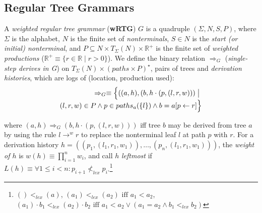 \documentclass[english]{article}
\newcommand\geneq{{\approx}}
\newcommand\comment[1]{}
\newcommand\powset[1]{\mathcal{P}(#1)}
\newcommand\logand{\wedge}
\newcommand\logor{\vee}
\newcommand\concat{\cdot}
\newcommand\assign{\leftarrow}
\newcommand\reals{\mathbb{R}}
\newcommand\positivereals{\mathbb{R}^{+}}
\newcommand\transformsto{\rightarrow}
\newcommand\derives{\Rightarrow}
\newcommand\logimplies{\implies} %
\newcommand\st{\;|\;}
\newcommand\bigst{\;\bigl | \;}
\newcommand{\kstar}{^{\star}}
\newcommand\cls[1]{\textbf{#1}}
\newcommand\derivess[1]{\derives_{#1}}
\begin{document}
\comment{
The \emph{$l$-labeled-children of $t$} are contained in the subsequence
$children_{t}^\geneq(l)=t\downarrow^\geneq (l)$:
\[
children_t^\geneq(l)\equiv  {
  c[subseqmap_{c,=_r}(l)] \text{ where } c\equiv children_t \text{ and } a=_rb \text{ iff } root(a)\geneq b
}
\]
}

\subsection{Regular Tree Grammars}

A \emph{weighted regular tree grammar} (\cls{wRTG}) $G$ is a quadruple
  $(\Sigma,N,S ,P)$, where $\Sigma$ is the alphabet, $N$ is the finite set of
  \emph{nonterminals}, $S \in{N}$ is the \emph{start (or initial) nonterminal},
  and \emph{$P\subseteq N\times T_{\Sigma}(N)\times\positivereals $} is the
  finite set of \emph{weighted productions} ($\positivereals \equiv\{
  r\in{\reals }\st r>0\}$).
  We define the binary relation $\derivess{G}$ (\emph{single-step derives in G})
  on $T_{\Sigma}(N) \times (paths \times P)\kstar$, pairs of trees and \emph{derivation histories}, which are logs of (location, production used):
  \[
  \begin{array}{r}
    \derives_{G}\equiv\Bigl\{((a,h),(b,h\concat (p,(l,r,w)))\bigst \\
    (l,r,w)\in{P}\logand p\in{paths_{a}(\{ l\})}\logand b=a[p\assign r]\Bigl\}
  \end{array}
  \]


  where $(a,h)\derivess{G}(b,h\concat (p,(l,r,w)))$ iff tree $b$ may be derived
  from tree $a$ by using the rule $l\transformsto^{w}r$ to replace the nonterminal
  leaf $l$ at path $p$ with $r$.  For a derivation history
  $h=((p_{1},(l_{1},r_{1},w_{1})),\ldots,(p_{n},(l_{1},r_{1},w_{1})))$, the \emph{weight of $h$} is $w(h) \equiv \prod_{i=1}^{n} w_{i}$, and call $h$ \emph{leftmost} if $L(h)\equiv \forall 1\leq i < n :  p_{i+1} \nless_{lex} p_{i}$.\footnote{$()<_{lex}(a)$, $(a_{1})<_{lex}(a_{2}) \textrm{ iff } a_{1}<a_{2}$,  $(a_{1}) \cdot b_{1}<_{lex} (a_{2})\cdot b_{2} \textrm{ iff } a_{1}<a_{2} \logor (a_{1}=a_{2} \logand b_{1}<_{lex} b_{2})$}
\end{document}
